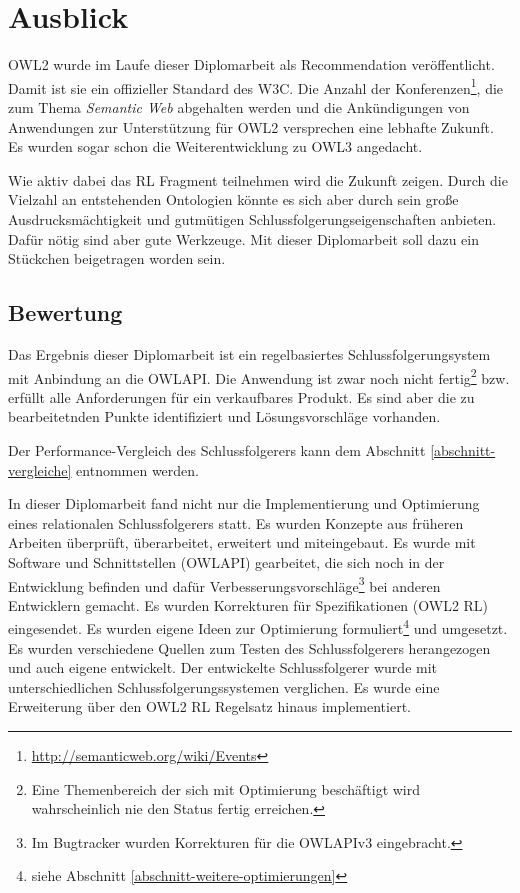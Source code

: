 \chapter{Ausblick}
\label{kapitel-ausblick}
OWL2 wurde im Laufe dieser Diplomarbeit als Recommendation veröffentlicht. Damit ist sie ein offizieller Standard des W3C. Die Anzahl der Konferenzen\footnote{\url{http://semanticweb.org/wiki/Events}}, die zum Thema \emph{Semantic Web} abgehalten werden und die Ankündigungen von Anwendungen zur Unterstützung für OWL2 versprechen eine lebhafte Zukunft. Es wurden sogar schon die Weiterentwicklung zu OWL3 \cite{Hitzler2009} angedacht.

Wie aktiv dabei das RL Fragment teilnehmen wird die Zukunft zeigen. Durch die Vielzahl an entstehenden Ontologien könnte es sich aber durch sein große Ausdrucksmächtigkeit und gutmütigen Schlussfolgerungseigenschaften anbieten. Dafür nötig sind aber gute Werkzeuge. Mit dieser Diplomarbeit soll dazu ein Stückchen beigetragen worden sein.

\section{Bewertung}
Das Ergebnis dieser Diplomarbeit ist ein regelbasiertes Schlussfolgerungsystem mit Anbindung an die OWLAPI. Die Anwendung ist zwar noch nicht fertig\footnote{Eine Themenbereich der sich mit Optimierung beschäftigt wird wahrscheinlich nie den Status fertig erreichen.} bzw. erfüllt alle Anforderungen für ein verkaufbares Produkt. Es sind aber die zu bearbeitetnden Punkte identifiziert und Lösungsvorschläge vorhanden.

Der Performance-Vergleich des Schlussfolgerers kann dem Abschnitt \ref{abschnitt-vergleiche} entnommen werden.

In dieser Diplomarbeit fand nicht nur die Implementierung und Optimierung eines relationalen Schlussfolgerers statt. Es wurden Konzepte aus früheren Arbeiten überprüft, überarbeitet, erweitert und miteingebaut. Es wurde mit Software und Schnittstellen (OWLAPI) gearbeitet, die sich noch in der Entwicklung befinden und dafür Verbesserungsvorschläge\footnote{Im Bugtracker wurden Korrekturen für die OWLAPIv3 eingebracht.} bei anderen Entwicklern gemacht. Es wurden Korrekturen für Spezifikationen (OWL2 RL) eingesendet. Es wurden eigene Ideen zur Optimierung formuliert\footnote{siehe Abschnitt \ref{abschnitt-weitere-optimierungen}} und umgesetzt. Es wurden verschiedene Quellen zum Testen des Schlussfolgerers herangezogen und auch eigene entwickelt. Der entwickelte Schlussfolgerer wurde mit unterschiedlichen Schlussfolgerungssystemen verglichen. Es wurde eine Erweiterung über den OWL2 RL Regelsatz hinaus implementiert.

